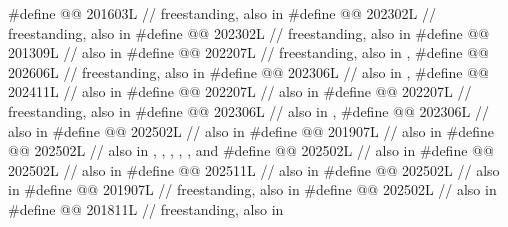 \begin{codeblock}
#define @@                             201603L // freestanding, also in 
#define @@                  202302L // freestanding, also in 
#define @@          202302L // freestanding, also in 
#define @@                      201309L // also in 
#define @@                          202207L
  // freestanding, also in , 
#define @@                  202606L // freestanding, also in 
#define @@              202306L // also in , 
#define @@                  202411L // also in 
#define @@                  202207L // also in 
#define @@                202207L // freestanding, also in 
#define @@                   202306L // also in , 
#define @@                 202306L // also in 
#define @@                   202502L // also in 
#define @@           201907L // also in 
#define @@              202502L
  // also in , , , , , and 
#define @@                202502L // also in 
#define @@                202502L // also in 
#define @@                  202511L // also in 
#define @@            202502L // also in 
#define @@              201907L // freestanding, also in 
#define @@          202502L // also in 
#define @@                201811L // freestanding, also in 

\end{codeblock}

